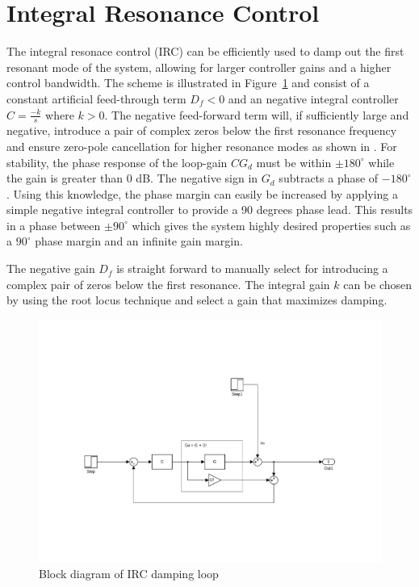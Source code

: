 \section{Integral Resonance Control}\label{sec:irc}
The integral resonace control (IRC) can be efficiently used to damp out the first resonant mode of the system, allowing for larger controller gains and a higher control bandwidth. The \abbrIRC scheme is illustrated in Figure~\ref{fig:irc} and consist of a constant artificial feed-through term $D_f<0$ and an negative integral controller $C=\frac{-k}{s}$ where $k>0$. The negative feed-forward term will, if sufficiently large and negative, introduce a pair of complex zeros below the first resonance frequency and ensure zero-pole cancellation for higher resonance modes as shown in \citep{Aphale:2007}. For stability, the phase response of the loop-gain $CG_d$ must be within $\pm180^{\circ}$ while the gain is greater than 0 dB. The negative sign in $G_d$ subtracts a phase of $-180^{\circ}$. Using this knowledge, the phase margin can easily be increased by applying a simple negative integral controller to provide a 90 degrees phase lead. This results in a phase between $\pm90^{\circ}$ which gives the system highly desired properties such as a $90^{\circ}$ phase margin and an infinite gain margin.

The negative gain $D_f$ is straight forward to manually select for introducing a complex pair of zeros below the first resonance. The integral gain $k$ can be chosen by using the root locus technique and select a gain that maximizes damping.

\begin{figure}[h]
  \centering %
  \includegraphics[width=1\textwidth, trim=5.5cm 3cm 5.1cm 9.5cm, clip=true]{fig/matlab/irc}
  \caption{\label{fig:irc}Block diagram of IRC damping loop}
\end{figure}

